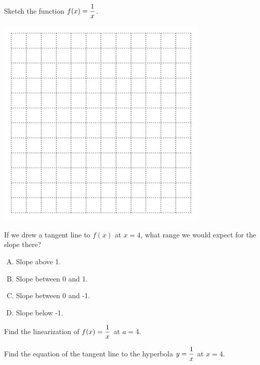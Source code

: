 
\begin{problem}
Sketch the function $\displaystyle f(x)=\frac{1}{x}$.
\end{problem}

\includegraphics[width=4in]{graphics/empty_graph_square_12}

\newpage

\begin{problem}
If we drew a tangent line to $f(x)$ at $x=4$, what range we would expect for the slope there?

\begin{enumerate}[A.]
\item Slope above 1. \\[2ex]
\item Slope between 0 and 1.  \\[2ex]
\item Slope between 0 and -1.\\[2ex] 
\item Slope below -1.
\end{enumerate}
\end{problem}



\newpage
\begin{problem}
 Find the linearization of $\displaystyle f(x)=\frac{1}{x}$ at $a=4$.
\end{problem}
\vfill
\vfill

 Find the equation of the tangent line to the hyperbola $\displaystyle y=\frac{1}{x} $ at $x=4$. 
\vfill

\newpage


